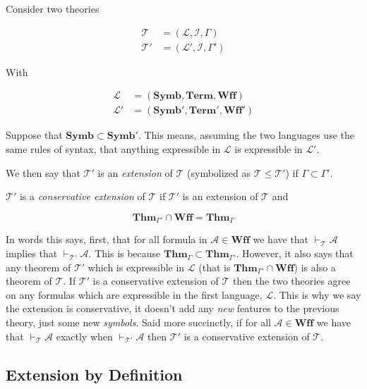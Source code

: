 \documentclass[12pt]{article}
\newcommand{\bv}[1]{\boldsymbol{#1}}
\newcommand{\mc}[1]{\mathcal{#1}}
\newcommand{\bc}[1]{\bv{\mc{#1}}}
\begin{document}
Consider two theories

\begin{equation}
\begin{split}
\bc{T} &= (\bv{\mc{L}},\bc{I},\Gamma)\\
\bc{T}' &= (\bv{\mc{L}}',\bc{I},\Gamma')
\end{split}
\end{equation}

With

\begin{equation}
\begin{split}
\bv{\mc{L}} &= (\textbf{Symb},\textbf{Term},\textbf{Wff})\\
\bv{\mc{L}'} &= (\textbf{Symb}',\textbf{Term}',\textbf{Wff}')
\end{split}
\end{equation}

Suppose that $\textbf{Symb} \subset \textbf{Symb}'$. This means, assuming the two languages use the same rules of syntax, that anything expressible in $\bv{\mc{L}}$ is expressible in $\bv{\mc{L}}'$.

We then say that $\bc{T}'$ is an \textit{extension} of $\bc{T}$ (symbolized as $\bc{T} \le \bc{T}'$) if $\Gamma \subset \Gamma'$. 

$\bc{T}'$ is a \textit{conservative extension} of $\bc{T}$ if $\bc{T}'$ is an extension of $\bc{T}$ and

$$
\textbf{Thm}_{\Gamma'} \cap \textbf{Wff} = \textbf{Thm}_{\Gamma}
$$

In words this says, first, that for all formula in $\mc{A} \in \textbf{Wff}$ we have that $\vdash_{\bc{T}} \mc{A}$ implies that $\vdash_{\bc{T}'} \mc{A}$. This is because $\textbf{Thm}_{\Gamma}\subset \textbf{Thm}_{\Gamma'}$. However, it also says that any theorem of $\bc{T}'$ which is expressible in $\bv{\mc{L}}$ (that is $\textbf{Thm}_{\Gamma'} \cap \textbf{Wff}$) is also a theorem of $\bc{T}$. If $\bc{T}'$ is a conservative extension of $\bc{T}$ then the two theories agree on any formulas which are expressible in the first language, $\bv{\mc{L}}$. This is why we say the extension is conservative, it doesn't add any \textit{new} features to the previous theory, just some new \textit{symbols}. Said more succinctly, if for all $\mc{A} \in \textbf{Wff}$ we have that $\vdash_{\bc{T}} \mc{A}$ exactly when $\vdash_{\bc{T}'} \mc{A}$ then $\bc{T}'$ is a conservative extension of $\bc{T}$.

\subsection{Extension by Definition}
\end{document}

